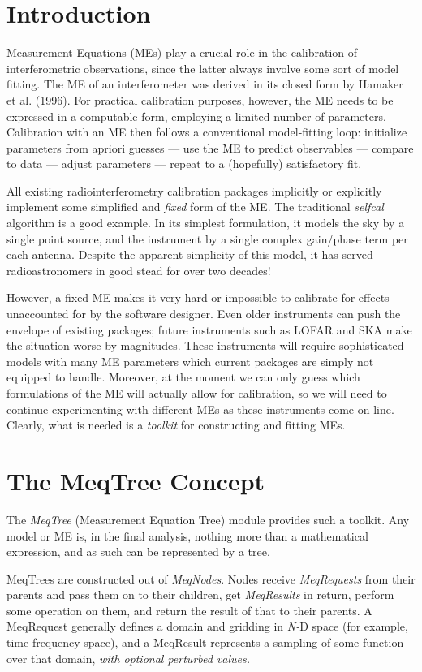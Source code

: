 \documentclass[11pt,twoside]{article}  %
\begin{document}
\section{Introduction}

Measurement Equations (MEs) play a crucial role in the calibration of
interferometric observations, since the latter always involve some sort of 
model fitting. The ME of an interferometer was derived in its closed form by
Hamaker et al. (1996). For practical calibration purposes, however, the ME needs
to be expressed in a computable form, employing a limited number of
parameters. Calibration with an ME then follows a conventional model-fitting
loop: initialize parameters from apriori guesses --- use the ME to predict
observables --- compare to data --- adjust parameters --- repeat to a
(hopefully) satisfactory fit.

All existing radiointerferometry calibration packages implicitly or explicitly
implement some simplified and {\em fixed} form of the ME. The traditional {\em
selfcal} algorithm is a good example. In its simplest formulation, it models the
sky by a single point source, and the instrument by a single complex gain/phase
term per each antenna. Despite the apparent simplicity of this model, it has
served radioastronomers in good stead for over two decades!

However, a fixed ME makes it very hard or impossible to calibrate for effects
unaccounted for by the software designer. Even older instruments can push the
envelope of existing packages; future instruments such as LOFAR and SKA make the
situation worse by magnitudes. These instruments will require sophisticated
models with many ME parameters which current packages are simply not equipped to
handle. Moreover, at the moment we can only guess which formulations
of the ME will actually allow for calibration, so we will need to continue
experimenting with different MEs as these instruments come on-line. Clearly,
what is needed is a {\em toolkit} for constructing and fitting MEs. 

\section{The MeqTree Concept}

The {\em MeqTree} (Measurement Equation Tree) module provides such a toolkit.
Any model or ME is, in the final analysis, nothing more than a mathematical
expression, and as such can be represented by a tree.

MeqTrees are constructed out of {\em MeqNodes}. Nodes receive {\em MeqRequests}
from their parents and pass them on to their children, get {\em MeqResults} in
return, perform some operation on them, and return the result of that to their
parents. A MeqRequest generally defines a domain and gridding in {\em N-}D space
(for example, time-frequency space), and a MeqResult represents a sampling of
some function over that domain, {\em with optional perturbed values.}
\end{document}
